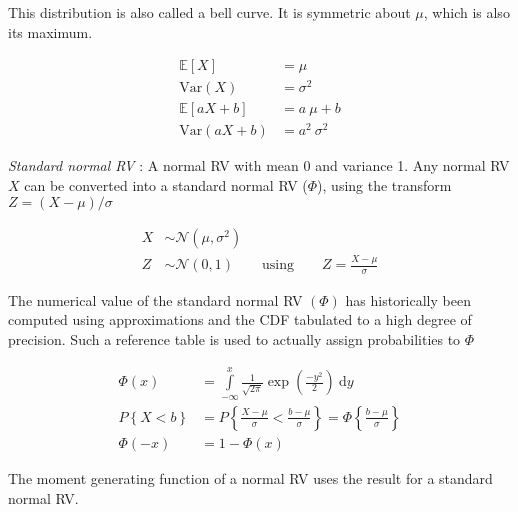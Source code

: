 This distribution is also called a bell curve. It is symmetric about $ \mu $, which is also its maximum.

\begin{align}
	\mathbb{E}[X] &= \mu \\
	\mathrm{Var}(X) &= \sigma^2 \\
	\mathbb{E}[aX + b] &= a\ \mu + b \nonumber \\
	\mathrm{Var}(aX + b) &= a^2 \ \sigma^2 \nonumber 
\end{align}

\textit{Standard normal RV} : A normal RV with mean 0 and variance 1. Any normal RV $ X $ can be converted into a standard normal RV ($ \Phi $), using the transform $ Z = (X - \mu) / \sigma$

\begin{align}
	X &\sim \mathcal{N}(\mu, \sigma^2) \nonumber \\
	Z &\sim \mathcal{N}(0, 1) \qquad \text{using} \qquad Z = \frac{X - \mu}{\sigma}
\end{align}

\begin{figure}[H]
	\centering
\end{figure}

The numerical value of the standard normal RV $ (\Phi) $ has historically been computed using approximations and the CDF tabulated to a high degree of precision. Such a reference table is used to actually assign probabilities to $ \Phi $ 

\begin{align}
	\Phi(x) &= \int\limits_{-\infty}^{x} \frac{1}{\sqrt{2 \pi}} \exp \left(\frac{-y^2}{2}\right)\ \mathrm{d}y \\
	P\left\{X < b\right\} &= P \left\{\frac{X - \mu}{\sigma} < \frac{b - \mu}{\sigma}\right\} = \Phi \left\{\frac{b - \mu}{\sigma}\right\} \\
	\Phi(-x) &= 1 - \Phi(x)
\end{align}

The moment generating function of a normal RV uses the result for a standard normal RV.

